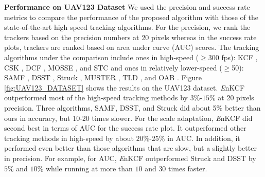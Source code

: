 \documentclass[10pt,twocolumn,letterpaper]{article}
\begin{document}
\textbf{Performance on UAV123 Dataset} We used the precision and
success rate metrics to compare the performance of the proposed
algorithm with those of the state-of-the-art high speed tracking
algorithms. For the precision, we rank the trackers based on the
precision numbers at 20 pixels whereas in the success rate plots,
trackers are ranked based on area under curve (AUC) scores. The
tracking algorithms under the comparison include ones in high-speed
($\geq$300 fps): KCF \cite{henriques2015high}, CSK
\cite{henriques2012exploiting}, DCF \cite{henriques2015high},
MOSSE \cite{bolme2010visual,henriques2015high}, and STC \cite{zhang2014fast} and ones in relatively
lower-speed ($\geq$50): SAMF \cite{li2014scale}, DSST
\cite{danelljan2014accurate}, Struck \cite{hare2012efficient}, MUSTER
\cite{hong2015multi}, TLD \cite{kalal2012tracking}, and OAB
\cite{zhang2012robust}. Figure \ref{fig:UAV123_DATASET} shows the
results on the UAV123 dataset. {\it E}nKCF outperformed most of the
high-speed tracking methods by $3\%$-$15\%$ at 20 pixels
precision. Three algorithms, SAMF, DSST, and Struck did about 5\%
better than ours in accuracy, but 10-20 times slower. For the scale
adaptation, {\it E}nKCF did second best in terms of AUC for the
success rate plot. It outperformed other tracking methods in
high-speed by about $20\%$-$25\%$ in AUC. In addition, it performed
even better than those algorithms that are slow, but a slightly better
in precision. For example, for AUC, {\it E}nKCF outperformed Struck
and DSST by $5\%$ and $10\%$ while running at more than $10$ and $30$
times faster.
\end{document}
